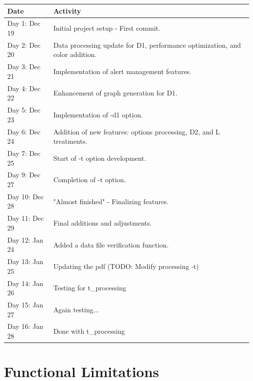 \documentclass[11pt]{article}
\begin{document}
\begin{tabular}{|l|p{10cm}|}
    \hline
    Date           & Activity                                                                     \\
    \hline
    Day 1: Dec 19  & Initial project setup - First commit.                                        \\
    Day 2: Dec 20  & Data processing update for D1, performance optimization, and color addition. \\
    Day 3: Dec 21  & Implementation of alert management features.                                 \\
    Day 4: Dec 22  & Enhancement of graph generation for D1.                                      \\
    Day 5: Dec 23  & Implementation of -d1 option.                                                \\
    Day 6: Dec 24  & Addition of new features: options processing, D2, and L treatments.          \\
    Day 7: Dec 25  & Start of -t option development.                                              \\
    Day 9: Dec 27  & Completion of -t option.                                                     \\
    Day 10: Dec 28 & "Almost finished" - Finalizing features.                                     \\
    Day 11: Dec 29 & Final additions and adjustments.                                             \\
    Day 12: Jan 24 & Added a data file verification function.                                     \\
    Day 13: Jan 25 & Updating the pdf (TODO: Modify processing -t)                                \\
    Day 14: Jan 26 & Testing for t\_processing                                                    \\
    Day 15: Jan 27 & Again testing...                                                             \\
    Day 16: Jan 28 & Done with t\_processing                                                      \\
    \hline
\end{tabular}

\section{Functional Limitations}
\end{document}
